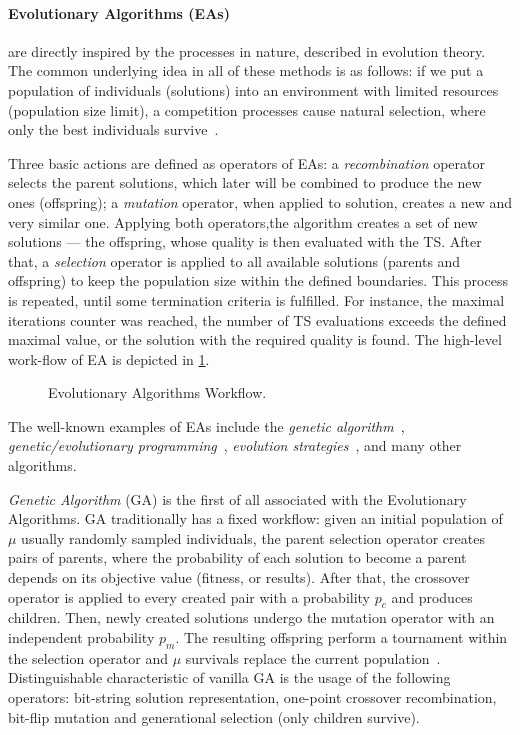 \paragraph{Evolutionary Algorithms (EAs)} are directly inspired by the processes in nature, described in evolution theory. The common underlying idea in all of these methods is as follows: if we put a population of individuals (solutions) into an environment with limited resources (population size limit), a competition processes cause natural selection, where only the best individuals survive~\cite{eiben2015evolutionary}.

Three basic actions are defined as operators of EAs: a \emph{recombination} operator selects the parent solutions, which later will be combined to produce the new ones (offspring); a \emph{mutation} operator, when applied to solution, creates a new and very similar one. Applying both operators,the algorithm creates a set of new solutions — the offspring, whose quality is then evaluated with the TS. After that, a \textit{selection} operator is applied to all available solutions (parents and offspring) to keep the population size within the defined boundaries. This process is repeated, until some termination criteria is fulfilled. For instance, the maximal iterations counter was reached, the number of TS evaluations exceeds the defined maximal value, or the solution with the required quality is found. The high-level work-flow of EA is depicted in \cref{bg:pic:EAs}.

\begin{figure}
	\centering
	
	\caption{Evolutionary Algorithms Workflow.}
	\label{bg:pic:EAs}
\end{figure}

The well-known examples of EAs include the \textit{genetic algorithm}~\cite{sastry2005genetic}, \textit{genetic/evolutionary programming}~\cite{koza1992evolution}, \textit{evolution strategies}~\cite{beyer2002evolution}, and many other algorithms.

\emph{Genetic Algorithm} (GA) is the first of all associated with the Evolutionary Algorithms. GA traditionally has a fixed workflow: given an initial population of $\mu$ usually randomly sampled individuals, the parent selection operator creates pairs of parents, where the probability of each solution to become a parent depends on its objective value (fitness, or results). After that, the crossover operator is applied to every created pair with a probability $p_c$ and produces children. Then, newly created solutions undergo the mutation operator with an independent probability $p_m$. The resulting offspring perform a tournament within the selection operator and $\mu$ survivals replace the current population~\cite{eiben2015popular}. Distinguishable characteristic of vanilla GA is the usage of the following operators: bit-string solution representation, one-point crossover recombination, bit-flip mutation and generational selection (only children survive).

